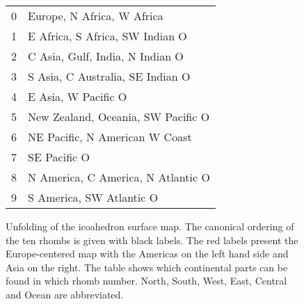 \documentclass[12pt]{article}
\begin{document}
\begin{figure} [ht]
  \centering
  
  \begin{minipage}[l]{.59\textwidth}
  

  \end{minipage}
  \begin{minipage}[r]{.39\textwidth}
  
    \tiny
    \begin{tabular}{ll}
    \hline
      0 & Europe, N Africa, W Africa \\
      1 & E Africa, S Africa, SW Indian O \\
      2 & C Asia, Gulf, India, N Indian O \\
      3 & S Asia, C Australia, SE Indian O \\
      4 & E Asia, W Pacific O \\
      5 & New Zealand, Oceania, SW Pacific O \\
      6 & NE Pacific, N American W Coast \\
      7 & SE Pacific O \\
      8 & N America, C America, N Atlantic O \\
      9 & S America, SW Atlantic O \\
    \hline
    \end{tabular}
    \normalsize
    
  \end{minipage}
  \label{fig:world_map_on_icosahedral_grid}
  \caption{Unfolding of the icoahedron surface map. The canonical ordering of the ten rhombs is given with black labels. The red labels
  present the Europe-centered map with the Americas on the left hand side and Asia on the right. The table shows which continental
  parts can be found in which rhomb number. North, South, West, East, Central and Ocean are abbreviated.
  } %
\end{figure}  
\end{document}
